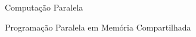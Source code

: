 \begin{section}{Computação Paralela}
\begin{subsection}{Programação Paralela em Memória Compartilhada}
%
%
%
%
%
%
%


\end{subsection}
\end{section}
